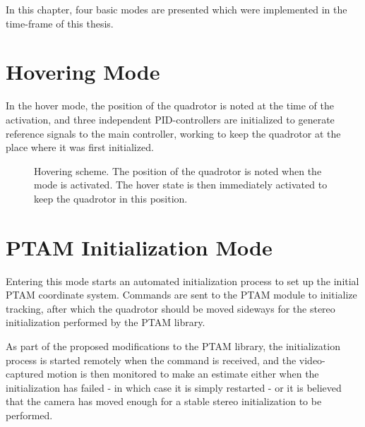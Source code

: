     In this chapter, four basic modes are presented which were implemented
    in the time-frame of this thesis.

    \section{Hovering Mode}
        In the hover mode, the position of the quadrotor is noted at
        the time of the activation, and three independent PID-controllers
        are initialized to generate reference signals to the main controller,
        working to keep the quadrotor at the place where it was first initialized.
        \begin{figure}[H]
            \noindent{}
            \caption{Hovering scheme. The position of the quadrotor is noted when the mode is activated. The hover state is then immediately activated to keep the quadrotor in this position.}
            \label{fig:logic:hoverscheme}
        \end{figure}

    \section{PTAM Initialization Mode}
        Entering this mode starts an automated initialization process
        to set up the initial PTAM coordinate system. Commands are sent
        to the PTAM module to initialize tracking, after which
        the quadrotor should be moved sideways for the
        stereo initialization performed by the PTAM library.

        As part of the proposed modifications to the PTAM library, the
        initialization process is started remotely when the command is received,
        and the video-captured motion is then monitored to make an estimate either
        when the initialization has failed - in which case it is simply restarted -
        or it is believed that the camera has moved enough for a stable
        stereo initialization to be performed.


